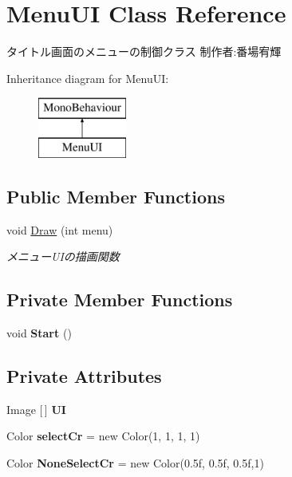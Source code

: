 \hypertarget{class_menu_u_i}{}\section{Menu\+UI Class Reference}
\label{class_menu_u_i}


タイトル画面のメニューの制御クラス 制作者\+:番場宥輝  


Inheritance diagram for Menu\+UI\+:\begin{figure}[H]
\begin{center}
\leavevmode
\includegraphics[height=2.000000cm]{class_menu_u_i}
\end{center}
\end{figure}
\subsection*{Public Member Functions}
\begin{DoxyCompactItemize}
\item 
void \hyperlink{class_menu_u_i_a16edb2d917c9859a3f5bd44fff7f9488}{Draw} (int menu)
\begin{DoxyCompactList}\small\item\em メニュー\+U\+Iの描画関数 \end{DoxyCompactList}\end{DoxyCompactItemize}
\subsection*{Private Member Functions}
\begin{DoxyCompactItemize}
\item 
\mbox{\label{class_menu_u_i_a2a3387f3ecc9189735578e9868bb3268}} 
void {\bfseries Start} ()
\end{DoxyCompactItemize}
\subsection*{Private Attributes}
\begin{DoxyCompactItemize}
\item 
\mbox{\label{class_menu_u_i_a7b8e1d47ae58ea7f0286956813445f45}} 
Image \mbox{[}$\,$\mbox{]} {\bfseries UI}
\item 
\mbox{\label{class_menu_u_i_ad33daeecc6a7677463119c7eb8e1a7b2}} 
Color {\bfseries select\+Cr} = new Color(1, 1, 1, 1)
\item 
\mbox{\label{class_menu_u_i_af9d9fcb38c950a837f7bc71a65ea1ba0}} 
Color {\bfseries None\+Select\+Cr} = new Color(0.\+5f, 0.\+5f, 0.\+5f,1)
\end{DoxyCompactItemize}


